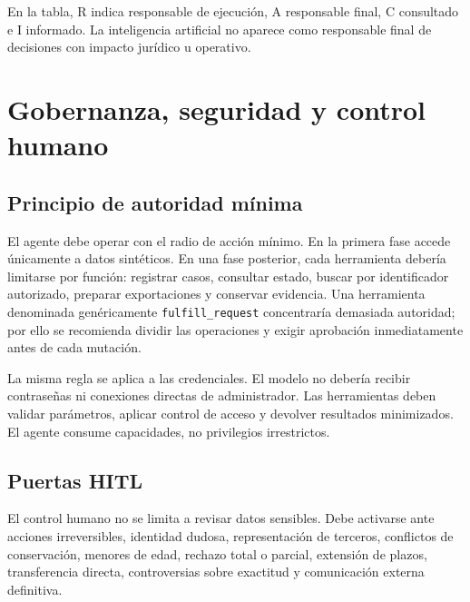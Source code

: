 \documentclass[11pt,a4paper]{article}
\begin{document}
En la tabla, R indica responsable de ejecución, A responsable final, C consultado e I informado. La inteligencia artificial no aparece como responsable final de decisiones con impacto jurídico u operativo.

\section{Gobernanza, seguridad y control humano}

\subsection{Principio de autoridad mínima}

El agente debe operar con el radio de acción mínimo. En la primera fase accede únicamente a datos sintéticos. En una fase posterior, cada herramienta debería limitarse por función: registrar casos, consultar estado, buscar por identificador autorizado, preparar exportaciones y conservar evidencia. Una herramienta denominada genéricamente \texttt{fulfill\_request} concentraría demasiada autoridad; por ello se recomienda dividir las operaciones y exigir aprobación inmediatamente antes de cada mutación.

La misma regla se aplica a las credenciales. El modelo no debería recibir contraseñas ni conexiones directas de administrador. Las herramientas deben validar parámetros, aplicar control de acceso y devolver resultados minimizados. El agente consume capacidades, no privilegios irrestrictos.

\subsection{Puertas HITL}

El control humano no se limita a revisar datos sensibles. Debe activarse ante acciones irreversibles, identidad dudosa, representación de terceros, conflictos de conservación, menores de edad, rechazo total o parcial, extensión de plazos, transferencia directa, controversias sobre exactitud y comunicación externa definitiva.
\end{document}
